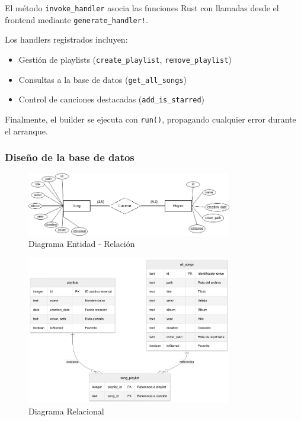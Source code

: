 \documentclass[11pt, a4paper]{article}
\begin{document}
            El método \verb|invoke_handler| asocia las funciones Rust con llamadas desde el frontend mediante \verb|generate_handler!|.

            Los handlers registrados incluyen:

            \begin{itemize}
              \item Gestión de playlists (\verb|create_playlist|, \verb|remove_playlist|)
              \item Consultas a la base de datos (\verb|get_all_songs|)
              \item Control de canciones destacadas (\verb|add_is_starred|)
            \end{itemize}

            Finalmente, el builder se ejecuta con \verb|run()|, propagando cualquier error durante el arranque.

            \subsubsection{Diseño de la base de datos}

            \begin{figure}[H]
              \centering
              \includegraphics[width=0.8\textwidth]{media/ER.drawio.png}
              \caption{Diagrama Entidad - Relación}
              \label{fig:er}
            \end{figure}

            \begin{figure}[H]
              \centering
              \includegraphics[width=0.8\textwidth]{media/DiagramaRelacional.png}
              \caption{Diagrama Relacional}
              \label{fig:relacional}
            \end{figure}
\end{document}
